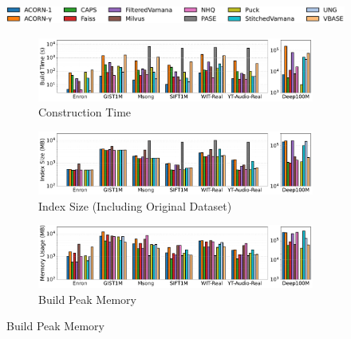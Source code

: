 \documentclass[sigconf, nonacm]{acmart}
\begin{document}
{\begin{figure}[t]
		
		\hspace*{8pt} %
		\includegraphics[width=0.95\columnwidth]{figures/indexData/legend_only.pdf} %
		
		
		\begin{subfigure}{\columnwidth}
			\centering
			
			\includegraphics[width=0.99\linewidth]{figures/indexData/exp_7_build_time_comparison_query1.pdf}
			\caption{Construction Time}
			\label{fig:build_time_comparison_query1}
		\end{subfigure}
		
		
		
		\begin{subfigure}{\columnwidth}
			\centering
			
			\includegraphics[width=0.99\linewidth]{figures/indexData/exp_7_index_size_mb_comparison_query1.pdf}
			\caption{Index Size (Including Original Dataset)}
			\label{fig:index_size_mb_comparison_query1}
		\end{subfigure}
		
		
		
		\begin{subfigure}{\columnwidth}
			\centering
			
			\includegraphics[width=0.99\linewidth]{figures/indexData/exp_7_memory_mb_comparison_query1.pdf}
			\caption{Build Peak Memory }
			\label{fig:build_memory_mb_comparison}
		\end{subfigure}
		

\end{figure}}
\end{document}
